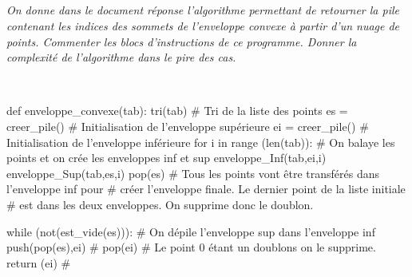 \documentclass[10pt,fleqn]{article} %
\begin{document}
\subparagraph{}
\textit{On donne dans le document réponse l'algorithme permettant de retourner la pile contenant les indices des sommets de l'enveloppe convexe à partir d'un nuage de points. Commenter les blocs d'instructions de ce programme. Donner la complexité de l'algorithme dans le pire des cas. }
\ifprof
\begin{corrige}~\\
\begin{py}
\begin{python}
def enveloppe_convexe(tab):
    tri(tab)                         # Tri de la liste des points
    es = creer_pile()                # Initialisation de l'enveloppe supérieure
    ei = creer_pile()                # Initialisation de l'enveloppe inférieure
    for i in range (len(tab)):       # On balaye les points et on crée les enveloppes inf et sup
        enveloppe_Inf(tab,ei,i)
        enveloppe_Sup(tab,es,i)
    pop(es)                          # Tous les points vont être transférés dans l'enveloppe inf pour 
                                     # créer l'enveloppe finale. Le dernier point de la liste initiale 
                                     # est dans les deux enveloppes. On supprime donc le doublon.

    while (not(est_vide(es))):       # On dépile l'enveloppe sup dans l'enveloppe inf
        push(pop(es),ei)             # 
    pop(ei)                          # Le point 0 étant un doublons on le supprime.
    return (ei)                      # 
\end{python}
\end{py}
\end{corrige}
\else
\fi
\end{document}
